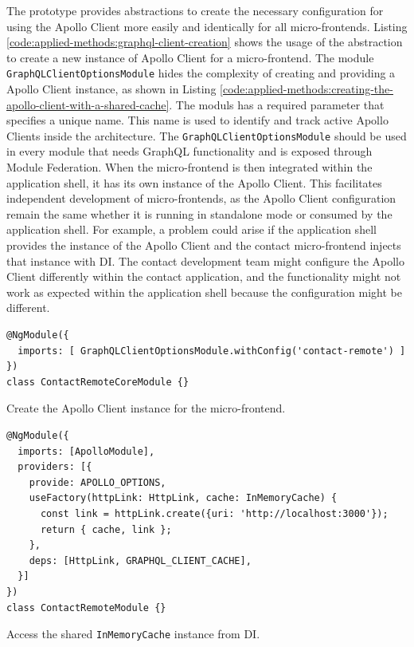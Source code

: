 \noindent The prototype provides abstractions to create the necessary configuration for using the Apollo Client more easily and identically for all micro-frontends. Listing \ref{code:applied-methods:graphql-client-creation} shows the usage of the abstraction to create a new instance of Apollo Client for a micro-frontend. The module \texttt{GraphQLClientOptionsModule} hides the complexity of creating and providing a Apollo Client instance, as shown in Listing \ref{code:applied-methods:creating-the-apollo-client-with-a-shared-cache}. The moduls has a required parameter that specifies a unique name. This name is used to identify and track active Apollo Clients inside the architecture. The \texttt{GraphQLClientOptionsModule} should be used in every module that needs GraphQL functionality and is exposed through Module Federation. When the micro-frontend is then integrated within the application shell, it has its own instance of the Apollo Client. This facilitates independent development of micro-frontends, as the Apollo Client configuration remain the same whether it is running in standalone mode or consumed by the application shell. For example, a problem could arise if the application shell provides the instance of the Apollo Client and the contact micro-frontend injects that instance with \ac{DI}. The contact development team might configure the Apollo Client differently within the contact application, and the functionality might not work as expected within the application shell because the configuration might be different.

\ifshowListings
\begin{listing}[H]
  \begin{verbatim}
@NgModule({
  imports: [ GraphQLClientOptionsModule.withConfig('contact-remote') ]
})
class ContactRemoteCoreModule {}
  \end{verbatim}
  \caption{Create the Apollo Client instance for the micro-frontend.}\label{code:applied-methods:graphql-client-creation}
  \end{listing}
\fi

\ifshowListings
\begin{listing}[H]
\begin{verbatim}
@NgModule({
  imports: [ApolloModule],
  providers: [{
    provide: APOLLO_OPTIONS,
    useFactory(httpLink: HttpLink, cache: InMemoryCache) {
      const link = httpLink.create({uri: 'http://localhost:3000'});
      return { cache, link };
    },
    deps: [HttpLink, GRAPHQL_CLIENT_CACHE],
  }]
})
class ContactRemoteModule {}
  \end{verbatim}
\caption{Access the shared \texttt{InMemoryCache} instance from \ac{DI}.}\label{code:applied-methods:creating-the-apollo-client-with-a-shared-cache}
\end{listing}
\fi

